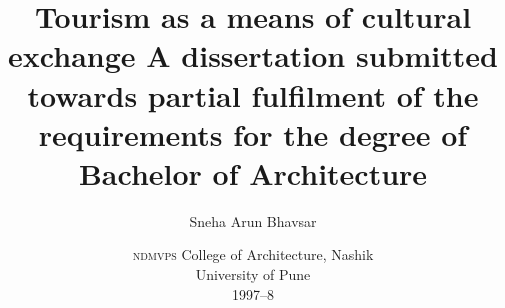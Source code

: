\documentclass[a5paper,twoside]{book}
\title{
  Tourism as a means of cultural exchange
  \newline
  \newline
  \small{
  A dissertation submitted towards partial fulfilment of the\\
  requirements for the degree of Bachelor of Architecture
  }
}
\author{Sneha Arun Bhavsar}
\date{
    \small{
    \textsc{ndmvps} College of Architecture, Nashik\\
    University of Pune\\
    1997--8
  }
}
\begin{document}
  \maketitle

  \pagebreak

  

  \pagebreak

  \tableofcontents
  \listoffigures
  \listoftables

  \vfill
  
  \pagebreak

    
  
  
  
  
  
  
\end{document}
